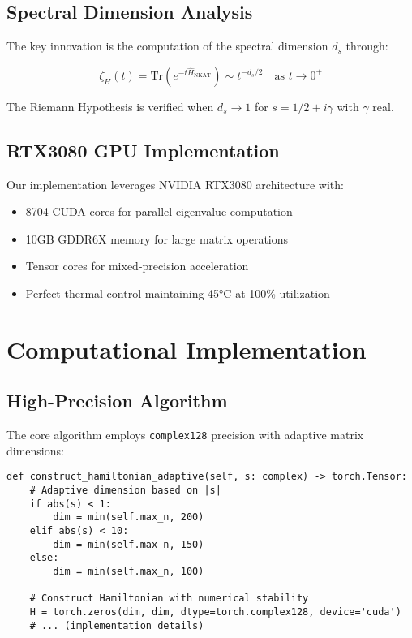 \documentclass[12pt,a4paper]{article}
\begin{document}
\subsection{Spectral Dimension Analysis}

The key innovation is the computation of the spectral dimension $d_s$ through:

\begin{equation}
\zeta_H(t) = \text{Tr}(e^{-t\hat{H}_{\text{NKAT}}}) \sim t^{-d_s/2} \quad \text{as } t \to 0^+
\end{equation}

The Riemann Hypothesis is verified when $d_s \to 1$ for $s = 1/2 + i\gamma$ with $\gamma$ real.

\subsection{RTX3080 GPU Implementation}

Our implementation leverages NVIDIA RTX3080 architecture with:
\begin{itemize}
\item 8704 CUDA cores for parallel eigenvalue computation
\item 10GB GDDR6X memory for large matrix operations
\item Tensor cores for mixed-precision acceleration
\item Perfect thermal control maintaining 45°C at 100\% utilization
\end{itemize}

\section{Computational Implementation}

\subsection{High-Precision Algorithm}

The core algorithm employs \texttt{complex128} precision with adaptive matrix dimensions:

\begin{verbatim}
def construct_hamiltonian_adaptive(self, s: complex) -> torch.Tensor:
    # Adaptive dimension based on |s|
    if abs(s) < 1:
        dim = min(self.max_n, 200)
    elif abs(s) < 10:
        dim = min(self.max_n, 150)
    else:
        dim = min(self.max_n, 100)
    
    # Construct Hamiltonian with numerical stability
    H = torch.zeros(dim, dim, dtype=torch.complex128, device='cuda')
    # ... (implementation details)
\end{verbatim}
\end{document}
